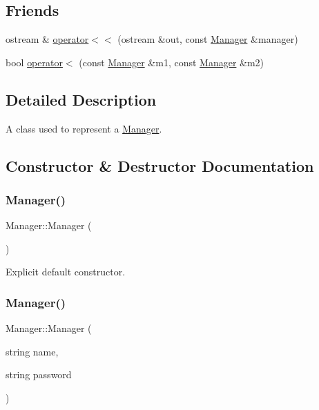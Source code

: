 \subsection*{Friends}
\begin{DoxyCompactItemize}
\item 
ostream \& \hyperlink{class_manager_aa5bf719dafd06d7f39a7c5f34421336d}{operator$<$$<$} (ostream \&out, const \hyperlink{class_manager}{Manager} \&manager)
\item 
bool \hyperlink{class_manager_a99e92cb4ec06950c06aaa800e538b6fd}{operator$<$} (const \hyperlink{class_manager}{Manager} \&m1, const \hyperlink{class_manager}{Manager} \&m2)
\end{DoxyCompactItemize}


\subsection{Detailed Description}
A class used to represent a \hyperlink{class_manager}{Manager}. 

\subsection{Constructor \& Destructor Documentation}
\hypertarget{class_manager_a51c8f271f79b1c6590e9bc4ae6343bc0}{}\label{class_manager_a51c8f271f79b1c6590e9bc4ae6343bc0} 
\subsubsection{\texorpdfstring{Manager()}{Manager()}\hspace{0.1cm}{\footnotesize\ttfamily [1/3]}}
{\footnotesize\ttfamily Manager\+::\+Manager (\begin{DoxyParamCaption}{ }\end{DoxyParamCaption})\hspace{0.3cm}{\ttfamily [default]}}

Explicit default constructor. \hypertarget{class_manager_ac2426e5aece723685d3f9fcf5db3874d}{}\label{class_manager_ac2426e5aece723685d3f9fcf5db3874d} 
\subsubsection{\texorpdfstring{Manager()}{Manager()}\hspace{0.1cm}{\footnotesize\ttfamily [2/3]}}
{\footnotesize\ttfamily Manager\+::\+Manager (\begin{DoxyParamCaption}\item[{string}]{name,  }\item[{string}]{password }\end{DoxyParamCaption})}

